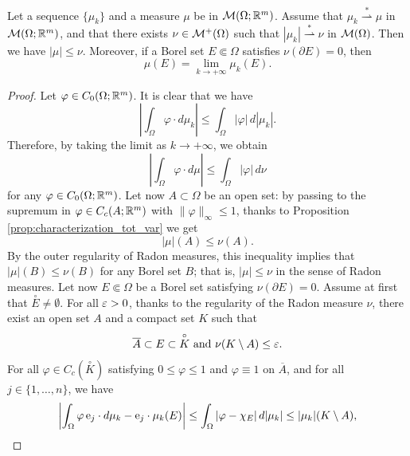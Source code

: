 \begin{theorem} \label{muweak-star} 
Let a sequence $\{\mu_{k}\}$ and a measure $\mu$ be in $\mathcal{M}(\Omega; \mathbb{R}^{m})$. Assume that $\mu_{k} \stackrel {*}{\rightharpoonup} \mu$ in $\mathcal{M}(\Omega; \mathbb{R}^{m})$, and that there exists $\nu \in \mathcal{M}^{+}(\Omega)$ such that $|\mu_{k}| \stackrel {*} {\rightharpoonup} \nu$ in $\mathcal{M}(\Omega)$. Then we have $|\mu| \le \nu$. Moreover, if a Borel set $E \Subset \Omega$ satisfies $\nu(\partial E) = 0$, then 
\[ \mu(E) = \lim_{k \to +\infty} \mu_{k}(E).  \]
\end{theorem}
\begin{proof}
Let $\varphi \in C_{0}(\Omega; \mathbb{R}^{m})$. It is clear that we have
\begin{equation*}
\left |\int_{\Omega} \varphi \cdot d \mu_{k} \right | \le \int_{\Omega} |\varphi| \, d |\mu_{k}|.
\end{equation*}
Therefore, by taking the limit as $k \to + \infty$, we obtain
\begin{equation*}
\left |\int_{\Omega} \varphi \cdot d \mu \right | \le \int_{\Omega} |\varphi| \, d \nu
\end{equation*}
for any $\varphi \in C_{0}(\Omega; \mathbb{R}^{m})$. Let now $A \subset \Omega$ be an open set: by passing to the supremum in $\varphi \in C_{c}(A; \mathbb{R}^{m})$ with $\|\varphi\|_{\infty} \le 1$, thanks to Proposition \ref{prop:characterization_tot_var} we get
\begin{equation*}
|\mu|(A) \le \nu(A).
\end{equation*}
By the outer regularity of Radon measures, this inequality implies that $|\mu|(B) \le \nu(B)$ for any Borel set $B$; that is, $|\mu| \le \nu$ in the sense of Radon measures.
Let now $E \Subset \Omega$ be a Borel set satisfying $\nu(\partial E) = 0$. Assume at first that $\overset{\circ}E \neq \emptyset$. For all $\varepsilon > 0$, thanks to the regularity of the Radon measure $\nu$, there exist an open set $A$ and a compact set $K$ such that 
\begin{equation*}
\overline{A} \subset E \subset \overset{\circ}K \text{ and } \nu(K \setminus A) \le \varepsilon.
\end{equation*}
For all $\varphi \in C_{c}(\overset{\circ}K)$ satisfying $0 \le \varphi \le 1$ and $\varphi \equiv 1$ on $\overline{A}$, and for all $j \in \{1, \dots, n\}$, we have
\begin{align*}
\left | \int_{\Omega} \varphi \, {\rm e}_{j} \cdot d \mu_{k} - {\rm e}_{j} \cdot\mu_{k}(E) \right | & \le \int_{\Omega} |\varphi - \chi_{E}| \, d |\mu_{k}| \le |\mu_{k}|(K \setminus A), \\

\end{align*}
\end{proof}
